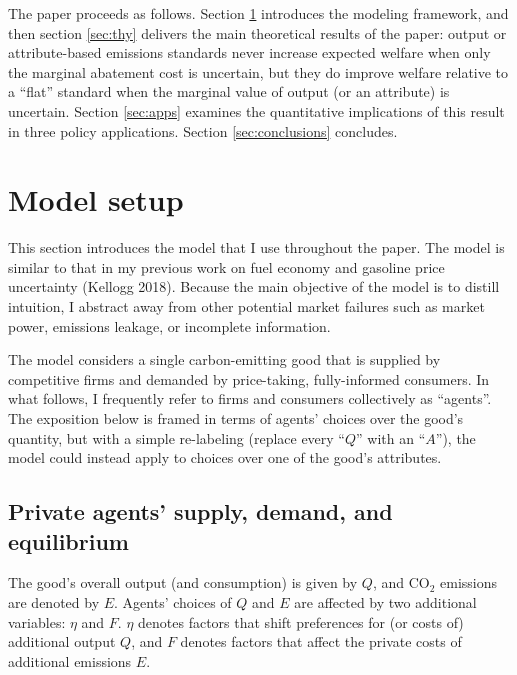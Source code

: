 \documentclass[12pt]{article}
\begin{document}
The paper proceeds as follows. Section \ref{sec:setup} introduces the modeling framework, and then section \ref{sec:thy} delivers the main theoretical results of the paper: output or attribute-based emissions standards never increase expected welfare when only the marginal abatement cost is uncertain, but they do improve welfare relative to a ``flat'' standard when the marginal value of output (or an attribute) is uncertain. Section \ref{sec:apps} examines the quantitative implications of this result in three policy applications. Section \ref{sec:conclusions} concludes.


\section{Model setup} \label{sec:setup}

This section introduces the model that I use throughout the paper. The model is similar to that in my previous work on fuel economy and gasoline price uncertainty (Kellogg 2018). Because the main objective of the model is to distill intuition, I abstract away from other potential market failures such as market power, emissions leakage, or incomplete information. 

The model considers a single carbon-emitting good that is supplied by competitive firms and demanded by price-taking, fully-informed consumers. In what follows, I frequently refer to firms and consumers collectively as ``agents''. The exposition below is framed in terms of agents' choices over the good's quantity, but with a simple re-labeling (replace every ``$Q$'' with an ``$A$''), the model could instead apply to choices over one of the good's attributes.


\subsection{Private agents' supply, demand, and equilibrium} \label{sec:private}

The good's overall output (and consumption) is given by $Q$, and CO$_{\text{2}}$ emissions are denoted by $E$. Agents' choices of $Q$ and $E$ are affected by two additional variables: $\eta$ and $F$. $\eta$ denotes factors that shift preferences for (or costs of) additional output $Q$, and $F$ denotes factors that affect the private costs of additional emissions $E$.
\end{document}

